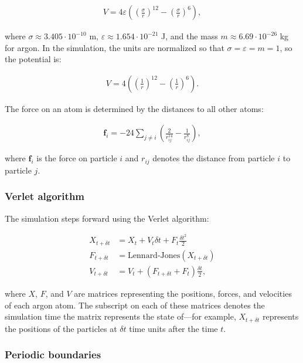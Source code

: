 \documentclass[twocolumn]{revtex4}
\begin{document}
\begin{align}
V = 4\varepsilon \left( \left(\frac{\sigma}{r}\right)^{12} - \left(\frac{\sigma}{r}\right)^6 \right),
\end{align}

where $\sigma \approx 3.405\cdot10^{-10}$ m, $\varepsilon \approx 1.654\cdot10^{-21}$ J, and the mass $m \approx 6.69\cdot10^{-26}$ kg for argon. In the simulation, the units are normalized so that $\sigma = \varepsilon = m = 1$, so the potential is:

\begin{align}
V = 4 \left( \left(\frac{1}{r}\right)^{12} - \left(\frac{1}{r}\right)^6 \right).
\end{align}

The force on an atom is determined by the distances to all other atoms:

\begin{align}
\mathbf{f}_{i} = -24 \sum_{j\ne i} \left( \frac{2}{r_{ij}^{14}} - \frac{1}{r_{ij}^8} \right),
\end{align}

where $\mathbf{f}_i$ is the force on particle $i$ and $r_{ij}$ denotes the distance from particle $i$ to particle $j$.

\subsubsection{Verlet algorithm}

The simulation steps forward using the Verlet algorithm:

\begin{align}
X_{t+\delta t} &= X_t + V_t \delta t + F_t \frac{\delta t^2}{2}\\
F_{t+\delta t} &= \text{Lennard-Jones}(X_{t+\delta t})\\
V_{t+\delta t} &= V_t + (F_{t+\delta t} + F_t) \frac{\delta t}{2},
\end{align}

where $X$, $F$, and $V$ are matrices representing the positions, forces, and velocities of each argon atom. The subscript on each of these matrices denotes the simulation time the matrix represents the state of---for example, $X_{t+\delta t}$ represents the positions of the particles at $\delta t$ time units after the time $t$.

\subsubsection{Periodic boundaries}
\end{document}
